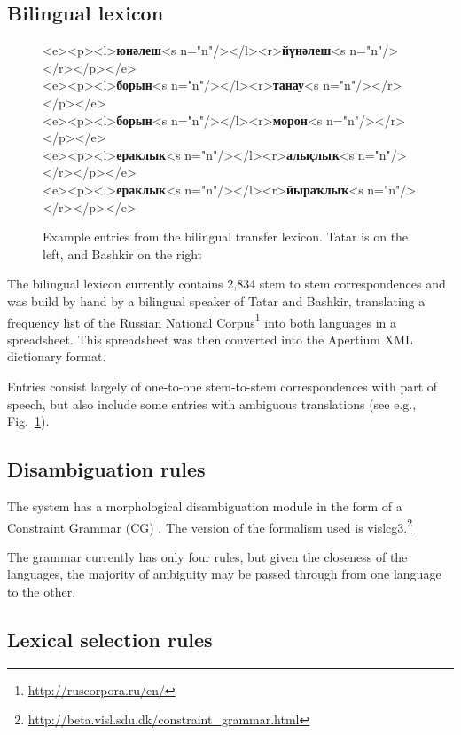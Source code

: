 \documentclass[11pt]{article}
\begin{document}
\subsection{Bilingual lexicon}
\begin{figure}[htbp]
\begin{texttt}
    <e><p><l>\textbf{юнәлеш}<s n="n"/></l><r>\textbf{йүнәлеш}<s n="n"/></r></p></e> \\
    <e><p><l>\textbf{борын}<s n="n"/></l><r>\textbf{танау}<s n="n"/></r></p></e> \\
    <e><p><l>\textbf{борын}<s n="n"/></l><r>\textbf{морон}<s n="n"/></r></p></e> \\
    <e><p><l>\textbf{ераклык}<s n="n"/></l><r>\textbf{алы{\qipa ҫ}лы{\qipa ҡ}}<s n="n"/></r></p></e> \\
    <e><p><l>\textbf{ераклык}<s n="n"/></l><r>\textbf{йыра{\qipa ҡ}лы{\qipa ҡ}}<s n="n"/></r></p></e>
\end{texttt}
\caption{Example entries from the bilingual transfer lexicon. Tatar is on the left, and Bashkir on the right}
\label{fig:bidix}
\end{figure}


The bilingual lexicon currently contains 2,834 stem to stem correspondences and was build by hand by a bilingual 
speaker of Tatar and Bashkir, translating a frequency list of the Russian National Corpus\footnote{\url{http://ruscorpora.ru/en/}} into both languages in a spreadsheet. This spreadsheet was then converted into the Apertium
XML dictionary format. 

Entries consist largely of one-to-one stem-to-stem correspondences with part of speech, but also
include some entries with ambiguous translations (see e.g., Fig.~\ref{fig:bidix}).

\subsection{Disambiguation rules}

The system has a morphological disambiguation module in the form of a 
Constraint Grammar (CG) \citep{karlsson95}. The version of the formalism used is 
vislcg3.\footnote{\url{http://beta.visl.sdu.dk/constraint_grammar.html}}

The grammar currently has only four rules, but given the closeness of the languages, the 
majority of ambiguity may be passed through from one language to the other.

\subsection{Lexical selection rules}
\end{document}
